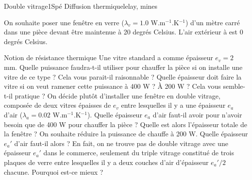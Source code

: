 \begin{exercise}{Double vitrage}{1}{Spé}
{Diffusion thermique}{lelay, mines}

On souhaite poser une fenêtre en verre ($\lambda_v = 1.0$ W.m$^{-1}$.K$^{-1}$) d'un mètre carré dans une pièce devant être maintenue à 20 degrés Celsius. L'air extérieur à est 0 degrés Celsius.

\begin{questions}
    \questioncours Notion de résistance thermique
    \question Une vitre standard a comme épaisseur $e_v = 2$ mm. Quelle puissance faudra-t-il utiliser pour chauffer la pièce si on installe une vitre de ce type ? Cela vous parait-il raisonnable ?
    \question Quelle épaisseur doit faire la vitre si on veut ramener cette puissance à 400 W ? À 200 W ? Cela vous semble-t-il pratique ?
    \question On décide plutôt d'installer une fenêtre en double vitrage, composée de deux vitres épaisses de $e_v$ entre lesquelles il y a une épaisseur $e_a$ d'air ($\lambda_a = 0.02$ W.m$^{-1}$.K$^{-1}$). Quelle épaisseur $e_a$ d'air faut-il avoir pour n'avoir besoin que de 400 W pour chauffer la pièce ? Quelle est alors l'épaisseur totale de la fenêtre ?
    \question On souhaite réduire la puissance de chauffe à 200 W. Quelle épaisseur $e_a'$ d'air faut-il alors ? 
    \question En fait, on ne trouve pas de double vitrage avec une épaisseur $e_a'$ dans le commerce, seulement du triple vitrage constitué de trois plaques de verre entre lesquelles il y a deux couches d'air d'épaisseur $e_a'/2$ chacune. Pourquoi est-ce mieux ?
\end{questions}

\end{exercise}
